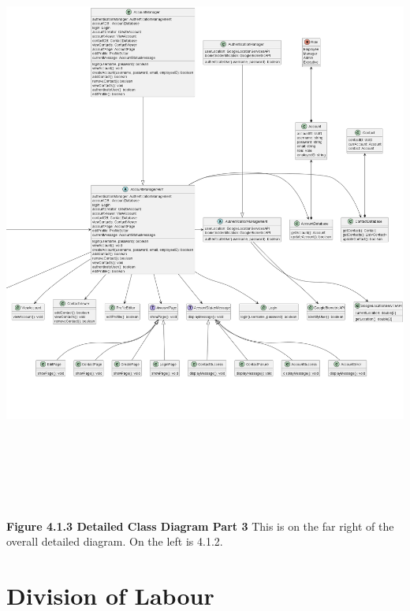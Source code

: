 \documentclass[]{article}
\begin{document}
\begin{center}
	\includegraphics[width=\textwidth,height=8in]{../images/ClassDiagram/right.png}
	\textbf{Figure 4.1.3 Detailed Class Diagram Part 3}
	\newline This is on the far right of the overall detailed diagram. On the left is 4.1.2.
\end{center}

\appendix
\section{Division of Labour}
\label{sec:division_of_labour}
\end{document}
